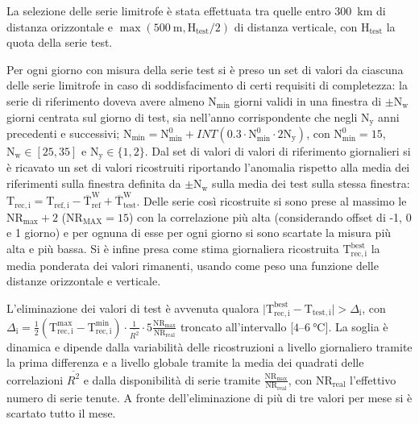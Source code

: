 La selezione delle serie limitrofe è stata effettuata tra quelle entro \qty{300}{\kilo\meter} di distanza orizzontale e \(\max(\qty{500}{\meter}, \mathrm{H_{test}}/2)\) di distanza verticale, con \(\mathrm{H_{test}}\) la quota della serie test.

Per ogni giorno con misura della serie test si è preso un set di valori da ciascuna delle serie limitrofe in caso di soddisfacimento di certi requisiti di completezza: la serie di riferimento doveva avere almeno \(\mathrm{N_{\min}}\) giorni validi in una finestra di \(\pm\mathrm{N_w}\) giorni centrata sul giorno di test, sia nell'anno corrispondente che negli \(\mathrm{N_y}\) anni precedenti e successivi; \(\mathrm{N_{\min}} = \mathrm{N^0_{\min}} + INT(0.3\cdot\mathrm{N^0_{\min}}\cdot2\mathrm{N_y})\), con \(\mathrm{N^0_{\min}} = 15\), \(\mathrm{N_w} \in [25, 35]\) e \(\mathrm{N_y} \in \{1, 2\} \). Dal set di valori di valori di riferimento giornalieri si è ricavato un set di valori ricostruiti riportando l'anomalia rispetto alla media dei riferimenti sulla finestra definita da \(\pm \mathrm{N_w}\) sulla media dei test sulla stessa finestra: \(\mathrm{T_{rec,i}} = \mathrm{T_{ref,i}} - \mathrm{\overline{T}_{ref}^W} + \mathrm{\overline{T}_{test}^W}\). Delle serie così ricostruite si sono prese al massimo le \(\mathrm{NR_{\max}} + 2\) (\(\mathrm{NR_{MAX}} = 15\)) con la correlazione più alta (considerando offset di -1, 0 e 1 giorno) e per ognuna di esse per ogni giorno si sono scartate la misura più alta e più bassa. Si è infine presa come stima giornaliera ricostruita \(\mathrm{T_{rec,i}^{best}}\) la media ponderata dei valori rimanenti, usando come peso una funzione delle distanze orizzontale e verticale.

L'eliminazione dei valori di test è avvenuta qualora \(\lvert \mathrm{T_{rec,i}^{best}} - \mathrm{T_{test,i}} \rvert > \Delta_\mathrm{i}\), con \(\Delta_\mathrm{i} = \frac{1}{2}(\mathrm{T_{rec,i}^{\max} - T_{rec,i}^{\min}})\cdot\frac{1}{\overline{R^2}}\cdot5\frac{\mathrm{NR_{\max}}}{\mathrm{NR_{real}}}\) troncato all'intervallo [\(\num{4}\)--\(\qty{6}{\degreeCelsius}\)]. La soglia è dinamica e dipende dalla variabilità delle ricostruzioni a livello giornaliero tramite la prima differenza e a livello globale tramite la media dei quadrati delle correlazioni \(\overline{R^2}\) e dalla disponibilità di serie tramite \(\frac{\mathrm{NR_{\max}}}{\mathrm{NR_{real}}}\), con \(\mathrm{NR_{real}}\) l'effettivo numero di serie tenute. A fronte dell'eliminazione di più di tre valori per mese si è scartato tutto il mese.